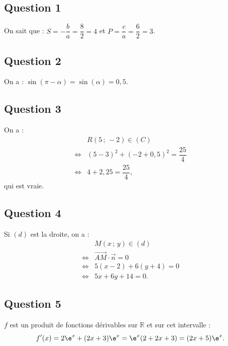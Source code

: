 \subsection*{Question 1}

On sait que : \(S = -\dfrac{b}{a} = \dfrac{8}{2} = 4\) et \(P = \dfrac{c}{a} = \dfrac{6}{2} = 3\).

\subsection*{Question 2}

On a : \(\sin(\pi - \alpha) = \sin(\alpha) = 0{,}5\).

\subsection*{Question 3}

On a :
\begin{align*}
&R(5\,;\,-2) \in (C) \\
\iff &(5 - 3)^2 + (-2 + 0{,}5)^2 = \dfrac{25}{4} \\
\iff &4 + 2{,}25 = \dfrac{25}{4},
\end{align*}
qui est vraie.

\subsection*{Question 4}

Si \((d)\) est la droite, on a :
\begin{align*}
&M(x\,;\,y) \in (d) \\
\iff &\overrightarrow{AM} \cdot \vec{n} = 0 \\
\iff &5(x - 2) + 6(y + 4) = 0 \\
\iff &5x + 6y + 14 = 0.
\end{align*}

\subsection*{Question 5}

\(f\) est un produit de fonctions dérivables sur \(\mathbb{R}\) et sur cet intervalle :
\[
f'(x) = 2\e^x + (2x + 3)\e^x = \e^x (2 + 2x + 3) = (2x + 5)\e^x.
\]

